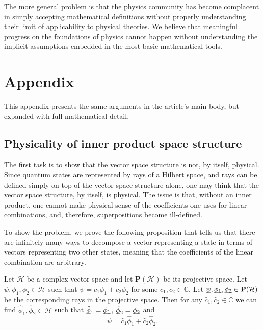 \documentclass[10pt,twocolumn, nofootinbib]{revtex4-2}
\begin{document}
The more general problem is that the physics community has become complacent in simply accepting mathematical definitions without properly understanding their limit of applicability to physical theories. We believe that meaningful progress on the foundations of physics cannot happen without understanding the implicit assumptions embedded in the most basic mathematical tools.



\newcommand{\pj}[1] {\underbar{$#1$}}

\section*{Appendix}

This appendix presents the same arguments in the article's main body, but expanded with full mathematical detail.

\subsection{Physicality of inner product space structure}

The first task is to show that the vector space structure is not, by itself, physical. Since quantum states are represented by rays of a Hilbert space, and rays can be defined simply on top of the vector space structure alone, one may think that the vector space structure, by itself, is physical. The issue is that, without an inner product, one cannot make physical sense of the coefficients one uses for linear combinations, and, therefore, superpositions become ill-defined.

To show the problem, we prove the following proposition that tells us that there are infinitely many ways to decompose a vector representing a state in terms of vectors representing two other states, meaning that the coefficients of the linear combination are arbitrary.
\begin{prop}\label{vector_insufficient} Let $\mathcal{H}$ be a complex vector space and let $\textbf{P}(\mathcal{H})$ be its projective space. Let $\psi, \phi_1, \phi_2 \in \mathcal{H}$ such that $\psi = c_1 \phi_1 + c_2 \phi_2$ for some $c_1, c_2 \in \mathbb{C}$. Let $\pj{\psi}, \pj{\phi_1}, \pj{\phi_2} \in \textbf{P}(\mathcal{H})$ be the corresponding rays in the projective space. Then for any $\hat{c}_1, \hat{c}_2 \in \mathbb{C}$ we can find  $\hat{\phi}_1, \hat{\phi}_2 \in \mathcal{H}$ such that $\pj{\hat{\phi}}_1 = \pj{\phi_1}$, $\pj{\hat{\phi}}_2 = \pj{\phi_2}$ and
$$\psi = \hat{c}_1 \hat{\phi}_1 + \hat{c}_2 \hat{\phi}_2.$$
\end{prop}
\end{document}
